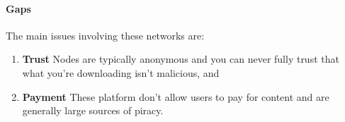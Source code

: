 \paragraph*{Gaps}
The main issues involving these networks are:

\begin{enumerate}
  \item \textbf{Trust} Nodes are typically anonymous and you can never fully trust that what you're downloading isn't malicious, and
  \item \textbf{Payment} These platform don't allow users to pay for content and are generally large sources of piracy. 
\end{enumerate}